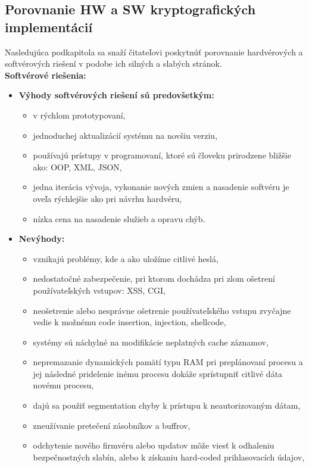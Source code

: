 \documentclass[12pt,a4paper,oneside,openright]{report}
\begin{document}
\subsection{Porovnanie HW a SW kryptografických implementácií} \label{s_cpyt_comparison}
Nasledujúca podkapitola sa snaží čitateľovi poskytnúť porovnanie hardvérových a softvérových riešení v podobe ich silných a slabých stránok. \\
\textbf{Softvérové riešenia:}
	\begin{itemize}
		\item \textbf{Výhody softvérových riešení sú predovšetkým:}
		\begin{itemize}
			\item v rýchlom prototypovaní,
			\item jednoduchej aktualizácií systému na novšiu verziu,
			\item používajú prístupy v programovaní, ktoré sú človeku prirodzene bližšie ako: OOP, XML, JSON,
			\item jedna iterácia vývoja, vykonanie nových zmien a nasadenie softvéru je oveľa rýchlejšie ako pri návrhu hardvéru,
			\item nízka cena na nasadenie služieb a opravu chýb.
		\end{itemize}
		\item \textbf{Nevýhody:}
		\begin{itemize}
			\item vznikajú problémy, kde a ako uložíme citlivé heslá,
			\item nedostatočné zabezpečenie, pri ktorom dochádza pri zlom ošetrení používateľských vstupov: XSS, CGI, 
			\item neošetrenie alebo nesprávne ošetrenie používateľského vstupu zvyčajne vedie k možnému code insertion, injection, shellcode,
			\item systémy sú náchylné na modifikácie neplatných cache záznamov,
			\item nepremazanie dynamických pamätí typu RAM pri preplánovaní procesu a jej následné pridelenie inému procesu dokáže sprístupniť citlivé dáta novému procesu,
			\item dajú sa použiť segmentation chyby k prístupu k neautorizovaným dátam,
			\item zneužívanie pretečení zásobníkov a buffrov,
			\item odchytenie nového firmvéru alebo updatov môže viesť k odhaleniu bezpečnostných slabín, alebo k získaniu hard-coded prihlasovacích údajov,

\end{itemize}
\end{itemize}
\end{document}

